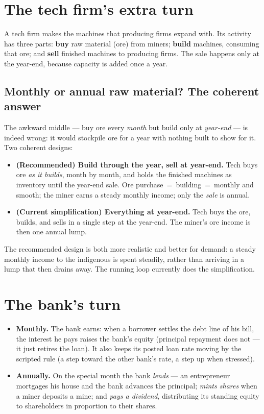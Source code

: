\documentclass[11pt]{article}
\begin{document}
\section{The tech firm's extra turn}

A tech firm makes the machines that producing firms expand with. Its activity has
three parts: \textbf{buy} raw material (ore) from miners; \textbf{build} machines,
consuming that ore; and \textbf{sell} finished machines to producing firms. The
sale happens only at the year-end, because capacity is added once a year.

\subsection{Monthly or annual raw material? The coherent answer}

The awkward middle --- buy ore every \emph{month} but build only at \emph{year-end}
--- is indeed wrong: it would stockpile ore for a year with nothing built to show
for it. Two coherent designs:

\begin{itemize}
\item \textbf{(Recommended) Build through the year, sell at year-end.} Tech buys
ore \emph{as it builds}, month by month, and holds the finished machines as
inventory until the year-end sale. Ore purchase \,=\, building \,=\, monthly and
smooth; the miner earns a steady monthly income; only the \emph{sale} is annual.
\item \textbf{(Current simplification) Everything at year-end.} Tech buys the ore,
builds, and sells in a single step at the year-end. The miner's ore income is then
one annual lump.
\end{itemize}

The recommended design is both more realistic and better for demand: a steady
monthly income to the indigenous is spent steadily, rather than arriving in a lump
that then drains away. The running loop currently does the simplification.

\section{The bank's turn}

\begin{itemize}
\item \textbf{Monthly.} The bank earns: when a borrower settles the debt line of
his bill, the interest he pays raises the bank's equity (principal repayment does
not --- it just retires the loan). It also keeps its posted loan rate moving by
the scripted rule (a step toward the other bank's rate, a step up when stressed).
\item \textbf{Annually.} On the special month the bank \emph{lends} --- an
entrepreneur mortgages his house and the bank advances the principal; \emph{mints
shares} when a miner deposits a mine; and \emph{pays a dividend}, distributing its
standing equity to shareholders in proportion to their shares.
\end{itemize}
\end{document}

